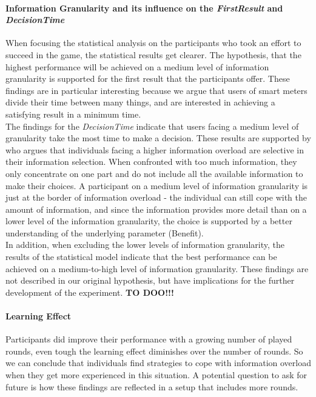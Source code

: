 \paragraph{Information Granularity and its influence on the \textit{FirstResult} and \textit{DecisionTime}}
When focusing the statistical analysis on the participants who took an effort to succeed in the game, the statistical results get clearer. The hypothesis, that the highest performance will be achieved on a medium level of information granularity is supported for the first result that the participants offer. These findings are in particular interesting because we argue that users of smart meters divide their time between many things, and are interested in achieving a satisfying result in a minimum time.\\
The findings for the \textit{DecisionTime} indicate that users facing a medium level of granularity take the most time to make a decision. These results are supported by \citep{Jacoby1974} who argues that individuals facing a higher information overload are selective in their information selection. When confronted with too much information, they only concentrate on one part and do not include all the available information to make their choices. A participant on a medium level of information granularity is just at the border of information overload - the individual can still cope with the amount of information, and since the information provides more detail than on a lower level of the information granularity, the choice is supported by a better understanding of the underlying parameter (Benefit).\\
In addition, when excluding the lower levels of information granularity, the results of the statistical model indicate that the best performance can be achieved on a medium-to-high level of information granularity. These findings are not described in our original hypothesis, but have implications for the further development of the experiment. \textbf{TO DOO!!!}

\paragraph{Learning Effect}

Participants did improve their performance with a growing number of played rounds, even tough the learning effect diminishes over the number of rounds. So we can conclude that individuals find strategies to cope with information overload when they get more experienced in this situation. A potential question to ask for future is how these findings are reflected in a setup that includes more rounds.

